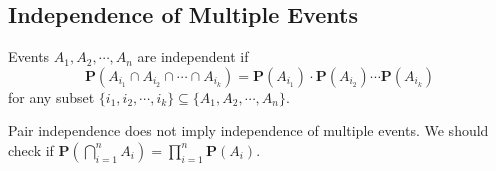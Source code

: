 \subsection{Independence of Multiple Events}
\begin{definition}
    Events $A_1, A_2, \cdots, A_n$ are independent if
    \begin{equation}
        \mathbf{P}(A_{i_1} \cap A_{i_2} \cap \cdots \cap A_{i_k}) = \mathbf{P}(A_{i_1}) \cdot \mathbf{P}(A_{i_2}) \cdots \mathbf{P}(A_{i_k})
    \end{equation}
    for any subset $\{i_1, i_2, \cdots, i_k\} \subseteq \{A_1, A_2, \cdots, A_n\}$.
\end{definition}
\begin{remark}
    Pair independence does not imply independence of multiple events. We should check if $\mathbf{P}(\bigcap_{i=1}^{n} A_i) = \prod_{i=1}^{n} \mathbf{P}(A_i)$.
\end{remark}

